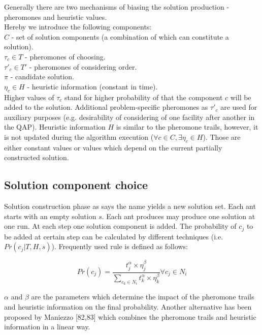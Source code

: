 Generally there are two mechanisms of biasing the solution production - pheromones and heuristic values. \\
Hereby we introduce the following components: \\
$C$ - set of solution components (a combination of which can constitute a solution). \\
$\tau_c \in T$ - pheromones of choosing. \\
$\tau'_c \in T'$ - pheromones of considering order. \\
$\pi$ - candidate solution. \\
$\eta_c \in H$ - heuristic information (constant in time). \\

Higher values of $\tau_c$ stand for higher probability of that the component $c$ will be added to the solution. Additional problem-specific pheromones as $\tau'_c$ are used for auxiliary purposes (e.g. desirability of considering of one facility after another in the QAP). Heuristic information $H$ is similar to the pheromone trails, however, it is not updated during the algorithm execution ($\forall c \in C, \exists \eta_c \in H$). Those are either constant values or values which depend on the current partially constructed solution.

\subsection{Solution component choice}

Solution construction phase as says the name yields a new solution set. Each ant starts with an empty solution $s$. Each ant produces may produce one solution at one run. At each step one solution component is added. The probability of $c_j$ to be added at certain step can be calculated by different techniques (i.e. $Pr(c_j|T,H,s)$). Frequently used rule is defined as follows:

\begin{equation}
Pr(c_j)=\frac{t_j^\alpha \times \eta_j^\beta}{\sum \limits_{c_k \in N_i} t_k^\alpha \times \eta_k^\beta} \forall c_j \in N_i
\label{eq:construction_classic}
\end{equation}

$\alpha$ and $\beta$ are the parameters which determine the impact of the pheromone trails and heuristic information on the final probability. Another alternative has been proposed by Maniezzo [82,83] which combines the pheromone trails and heuristic information in a linear way.

